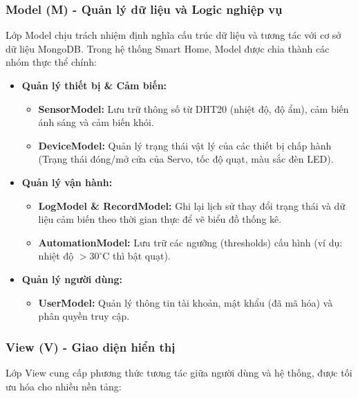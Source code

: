 \documentclass[a4paper,twoside]{article}
\begin{document}
\subsubsection{Model (M) - Quản lý dữ liệu và Logic nghiệp vụ}
Lớp Model chịu trách nhiệm định nghĩa cấu trúc dữ liệu và tương tác với cơ sở dữ liệu MongoDB. Trong hệ thống Smart Home, Model được chia thành các nhóm thực thể chính:

\begin{itemize}
    \item \textbf{Quản lý thiết bị \& Cảm biến:}
    \begin{itemize}
        \item \textbf{SensorModel:} Lưu trữ thông số từ DHT20 (nhiệt độ, độ ẩm), cảm biến ánh sáng và cảm biến khói.
        \item \textbf{DeviceModel:} Quản lý trạng thái vật lý của các thiết bị chấp hành (Trạng thái đóng/mở cửa của Servo, tốc độ quạt, màu sắc đèn LED).
    \end{itemize}
    
    \item \textbf{Quản lý vận hành:}
    \begin{itemize}
        \item \textbf{LogModel \& RecordModel:} Ghi lại lịch sử thay đổi trạng thái và dữ liệu cảm biến theo thời gian thực để vẽ biểu đồ thống kê.
        \item \textbf{AutomationModel:} Lưu trữ các ngưỡng (thresholds) cấu hình (ví dụ: nhiệt độ $> 30^\circ$C thì bật quạt).
    \end{itemize}
    
    \item \textbf{Quản lý người dùng:}
    \begin{itemize}
        \item \textbf{UserModel:} Quản lý thông tin tài khoản, mật khẩu (đã mã hóa) và phân quyền truy cập.
    \end{itemize}
\end{itemize}

\subsubsection{View (V) - Giao diện hiển thị}
Lớp View cung cấp phương thức tương tác giữa người dùng và hệ thống, được tối ưu hóa cho nhiều nền tảng:
\end{document}
